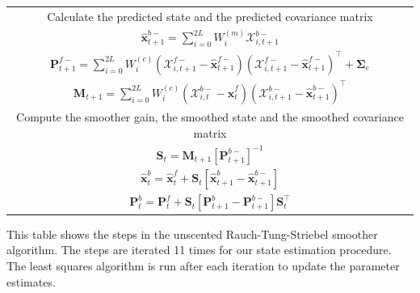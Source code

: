 \documentclass[10pt]{article}
\begin{document}
\begin{table}[!ht]
\begin{tabular}{|c|}
\multicolumn{1}{|p{16cm}|}{Calculate the predicted state and the predicted covariance matrix}\\
$\hat{\mathbf x}_{t+1}^{b-}=\sum_{i=0}^{2L} W_i^{(m)}\mathcal X_{i,t+1}^{b-}$\\
$\mathbf P_{t +1}^{f-}=\sum_{i=0}^{2L} W_i^{(c)}(\mathcal X_{i,t+1}^{f-}-\hat{\mathbf x}_{t +1}^{f-})(\mathcal X_{i,t+1}^{f-}-\hat{\mathbf x}_{t +1}^{f-})^\top+\boldsymbol \Sigma_e $\\
$\mathbf M_{t +1}=\sum_{i=0}^{2L} W_i^{(c)}(\mathcal X_{i,t}^{b-}-\hat{\mathbf x}_{t}^{f})(\mathcal X_{i,t+1}^{b-}-\hat{\mathbf x}_{t+1}^{b-})^\top$\\
\multicolumn{1}{|p{16cm}|}{Compute the smoother gain, the smoothed state and the smoothed covariance matrix}\\
$\mathbf S_t=\mathbf M_{t +1}\left[ \mathbf P_{t +1}^{b-}\right] ^{-1} $\\
$\hat{\mathbf x}_t^b=\hat{\mathbf x}_t^f+\mathbf S_t\left[\hat{\mathbf x}_{t+1}^{b}-\hat{\mathbf x}_{t+1}^{b-}\right]$\\
$\mathbf P_{t}^{b}=\mathbf P_{t}^{f}+\mathbf S_t\left[\mathbf P_{t+1}^{b}-\mathbf P_{t+1}^{b-} \right]\mathbf S_t^\top $\\
\hline
\end{tabular}
\begin{flushleft}This table shows the steps in the unscented Rauch-Tung-Striebel smoother algorithm. The steps are iterated 11 times for our state estimation procedure. The least squares algorithm is run after each iteration to update the parameter estimates.
\end{flushleft}
\label{tab:UKFAlgorithm}
\end{table}
\renewcommand{\arraystretch}{1}
\end{document}
